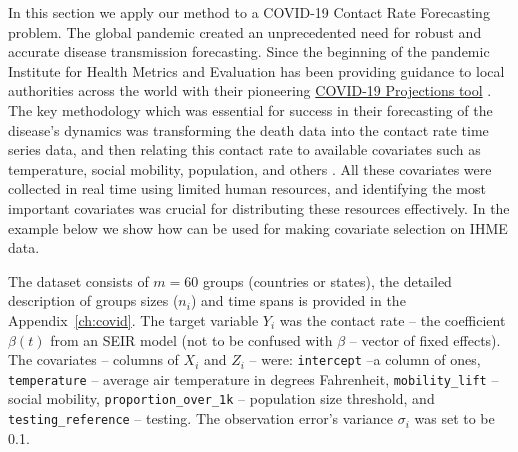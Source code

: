 In this section we apply our method to a COVID-19 Contact Rate Forecasting problem. The global pandemic created an unprecedented need for robust and accurate disease transmission forecasting. Since the beginning of the pandemic Institute for Health Metrics and Evaluation has been providing guidance to local authorities across the world with their pioneering \href{https://covid19.healthdata.org/global?view=total-deaths&tab=trend}{COVID-19 Projections tool} \cite{IHME2020Projections}. The key methodology which was essential for success in their forecasting of the disease's dynamics was transforming the death data into the contact rate time series data, and then relating this contact rate to available covariates such as temperature, social mobility, population, and others \cite{IHME2020covidnature}. All these covariates were collected in real time using limited human resources, and identifying the most important covariates was crucial for distributing these resources effectively. In the example below we show how \ouralgo can be used for making covariate selection on IHME data. 


The dataset consists of $m=60$ groups (countries or states), the detailed description of groups sizes ($n_i$) and time spans is provided in the Appendix~\ref{ch:covid}. The target variable $Y_i$ was the contact rate -- the coefficient $\beta(t)$ from an SEIR model (not to be confused with $\beta$ -- vector of fixed effects). The covariates -- columns of $X_i$ and $Z_i$ -- were: \texttt{intercept} --a column of ones,  \texttt{temperature} -- average air temperature in degrees Fahrenheit, \texttt{mobility\_lift} -- social mobility, \texttt{proportion\_over\_1k} -- population size threshold, and \texttt{testing\_reference} -- testing. The observation error's variance $\sigma_i$ was set to be 0.1.

